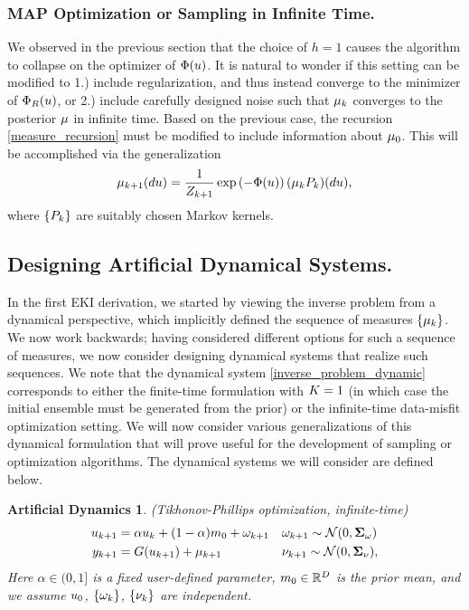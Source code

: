 \documentclass[12pt]{article}
\newtheorem{dynamics}{Artificial Dynamics}
\begin{document}
\subsubsection{MAP Optimization or Sampling in Infinite Time.} 
We observed in the previous section that the choice of $h = 1$ causes the algorithm 
to collapse on the optimizer of $\SSR(\spar)$. It is natural to wonder if this setting can be modified to 1.) include regularization, and thus 
instead converge to the minimizer of $\SSR_R(\spar)$, or 2.) include carefully designed noise such that $\postMeas_{\timeStep}$ converges
to the posterior $\postMeas$ in infinite time. Based on the previous case, the recursion \ref{measure_recursion} must be modified to include 
information about $\priorMeas$. This will be accomplished via the generalization 
\begin{align} 
\postMeas_{\timeStep+1}(d\spar) = \frac{1}{Z_{\timeStep+1}} \exp\left(-\SSR(\spar) \right) (\postMeas_{\timeStep} P_{\timeStep})(d\spar) \label{measure_recursion_regularized},
\end{align}
where $\{P_{\timeStep}\}$ are suitably chosen Markov kernels. 

\subsection{Designing Artificial Dynamical Systems.}
 In the first EKI derivation, we started by viewing the inverse problem from a dynamical perspective, which implicitly 
defined the sequence of measures $\{\postMeas_{\timeStep}\}$. We now work backwards; having considered different options for such a sequence of measures, we now 
consider designing dynamical systems that realize such sequences. We note that the dynamical system \ref{inverse_problem_dynamic} corresponds to 
either the finite-time formulation with $\Ntimestep=1$ (in which case the initial ensemble must be generated from the prior) or the infinite-time data-misfit optimization 
setting. We will now consider various generalizations of this dynamical formulation that will prove useful for the development of sampling or optimization algorithms. 
The dynamical systems we will consider are defined below. 

\begin{dynamics} (Tikhonov-Phillips optimization, infinite-time) \\
\begin{align}
\dpar[\timeStep+1] &= \alpha \dpar + (1-\alpha)\priorMean + \omega_{\timeStep+1} &&\omega_{\timeStep+1} \sim \Gaussian(0, \CovObs_{\omega}) \\
\ddataObs[\timeStep+1] &= \fwd(\dpar[\timeStep+1]) + \mu_{\timeStep+1} &&\nu_{\timeStep+1} \sim \Gaussian(0, \CovObs_{\nu}), \nonumber
\end{align}
Here $\alpha \in (0, 1]$ is a fixed user-defined parameter, $\priorMean \in \R^{\Npar}$ is the prior mean, and we assume $\spar_0$, $\{\omega_{\timeStep}\}$, $\{\nu_{\timeStep}\}$ are independent. 
\end{dynamics}
\end{document}
